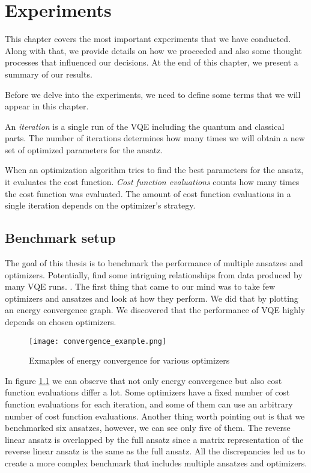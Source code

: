 \chapter{Experiments}\label{ch:experiments}
This chapter covers the most important experiments that we have conducted. Along with that, we provide details on how we proceeded and also some thought processes that influenced our decisions. At the end of this chapter, we present a summary of our results.

Before we delve into the experiments, we need to define some terms that we will appear in this chapter.

An \textit{iteration} is a single run of the VQE including the quantum and classical parts. The number of iterations determines how many times we will obtain a new set of optimized parameters for the ansatz.

When an optimization algorithm tries to find the best parameters for the ansatz, it evaluates the cost function. \textit{Cost function evaluations} counts how many times the cost function was evaluated. The amount of cost function evaluations in a single iteration depends on the optimizer's strategy.

\section{Benchmark setup}
The goal of this thesis is to benchmark the performance of multiple ansatzes and optimizers. Potentially, find some intriguing relationships from data produced by many VQE runs. . The first thing that came to our mind was to take few optimizers and ansatzes and look at how they perform. We did that by plotting an energy convergence graph. We discovered that the performance of VQE highly depends on chosen optimizers. 

\begin{figure}[H]
    \centering
    \texttt{[image: convergence\_example.png]}
    \caption{Exmaples of energy convergence for various optimizers}
    \label{fig:energy-convergence}
\end{figure}

In figure \ref{fig:energy-convergence} we can observe that not only energy convergence but also cost function evaluations differ a lot. Some optimizers have a fixed number of cost function evaluations for each iteration, and some of them can use an arbitrary number of cost function evaluations.  Another thing worth pointing out is that we benchmarked six ansatzes, however, we can see only five of them. The reverse linear ansatz is overlapped by the full ansatz since a matrix representation of the reverse linear ansatz is the same as the full ansatz. All the discrepancies led us to create a more complex benchmark that includes multiple ansatzes and optimizers.

